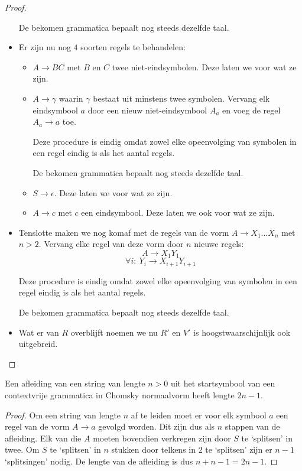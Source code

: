 \documentclass[main.tex]{subfiles}
\begin{document}
\begin{st}
\begin{proof}
\begin{itemize}
      De bekomen grammatica bepaalt nog steeds dezelfde taal.

    \item Er zijn nu nog $4$ soorten regels te behandelen:
      \begin{itemize}
      \item $A\rightarrow BC$ met $B$ en $C$ twee niet-eindsymbolen.
        Deze laten we voor wat ze zijn.
      \item $A\rightarrow \gamma$ waarin $\gamma$ bestaat uit minstens twee symbolen.
        Vervang elk eindsymbool $a$ door een nieuw niet-eindsymbool $A_{a}$ en voeg de regel $A_{a} \rightarrow a$ toe.

        Deze procedure is eindig omdat zowel elke opeenvolging van symbolen in een regel eindig is als het aantal regels.

        De bekomen grammatica bepaalt nog steeds dezelfde taal.

      \item $S\rightarrow \epsilon$.
        Deze laten we voor wat ze zijn.
      \item $A\rightarrow c$ met $c$ een eindsymbool.
        Deze laten we ook voor wat ze zijn.
      \end{itemize}
    
    \item Tenslotte maken we nog komaf met de regels van de vorm $A \rightarrow X_{1}\dotsc X_{n}$ met $n > 2$.
      Vervang elke regel van deze vorm door $n$ nieuwe regels:
      \[ A \rightarrow X_{1}Y_{1} \]
      \[ \forall i:\ Y_{i} \rightarrow X_{i+1}Y_{i+1} \]

      Deze procedure is eindig omdat zowel elke opeenvolging van symbolen in een regel eindig is als het aantal regels.

      De bekomen grammatica bepaalt nog steeds dezelfde taal.


    \item Wat er van $R$ overblijft noemen we nu $R'$ en $V'$ is hoogstwaarschijnlijk ook uitgebreid.
    \end{itemize}
  \end{proof}
\end{st}

\begin{st}
  Een afleiding van een string van lengte $n>0$ uit het startsymbool van een contextvrije grammatica in Chomsky normaalvorm heeft lengte $2n-1$.
  \begin{proof}
    Om een string van lengte $n$ af te leiden moet er voor elk symbool $a$ een regel van de vorm $A \rightarrow a$ gevolgd worden.
    Dit zijn dus als $n$ stappen van de afleiding.
    Elk van die $A$ moeten bovendien verkregen zijn door $S$ te `splitsen' in twee.
    Om $S$ te `splitsen' in $n$ stukken door telkens in $2$ te `splitsen' zijn er $n-1$ `splitsingen' nodig.
    De lengte van de afleiding is dus $n + n - 1 = 2n-1$.
  \end{proof}
\end{st}
\end{document}
